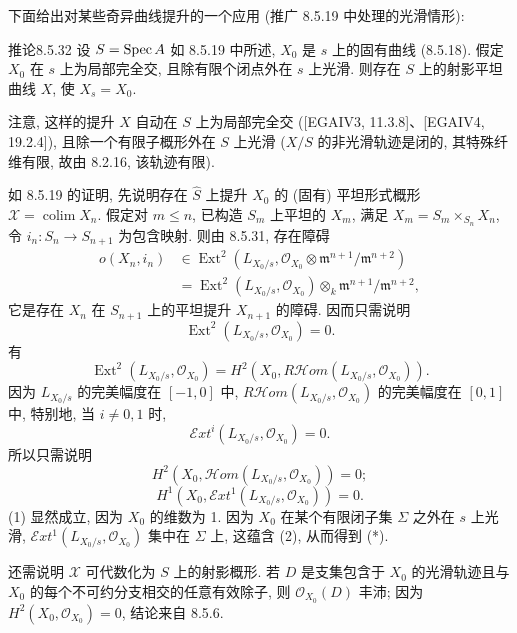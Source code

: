 下面给出对某些奇异曲线提升的一个应用 (推广 8.5.19 中处理的光滑情形):
\begin{origstatement}{推论}{8.5.32}\label{ch08:cor8532}
设 $S=\operatorname{Spec} A$ 如 8.5.19 中所述, $X_0$ 是 $s$ 上的固有曲线 (8.5.18). 假定 $X_0$ 在 $s$ 上为局部完全交, 且除有限个闭点外在 $s$ 上光滑. 则存在 $S$ 上的射影平坦曲线 $X$, 使 $X_s=X_0$.
\end{origstatement}
注意, 这样的提升 $X$ 自动在 $S$ 上为局部完全交 ([EGAIV3, 11.3.8]、[EGAIV4, 19.2.4]), 且除一个有限子概形外在 $S$ 上光滑 ($X/S$ 的非光滑轨迹是闭的, 其特殊纤维有限, 故由 8.2.16, 该轨迹有限).

如 8.5.19 的证明, 先说明存在 $\widehat S$ 上提升 $X_0$ 的 (固有) 平坦形式概形 $\mathcal X=\operatorname{colim}X_n$. 假定对 $m\leq n$, 已构造 $S_m$ 上平坦的 $X_m$, 满足 $X_m=S_m\times_{S_n}X_n$, 令 $i_n:S_n\to S_{n+1}$ 为包含映射. 则由 8.5.31, 存在障碍
\[\begin{aligned}
o(X_n,i_n)&\in\operatorname{Ext}^2(L_{X_0/s},\mathcal O_{X_0}\otimes\mathfrak m^{n+1}/\mathfrak m^{n+2})\\
&=\operatorname{Ext}^2(L_{X_0/s},\mathcal O_{X_0})\otimes_k\mathfrak m^{n+1}/\mathfrak m^{n+2},
\end{aligned}\]
它是存在 $X_n$ 在 $S_{n+1}$ 上的平坦提升 $X_{n+1}$ 的障碍. 因而只需说明
\begin{equation}\operatorname{Ext}^2(L_{X_0/s},\mathcal O_{X_0})=0.\tag{*}\label{ch08:eq8532star}\end{equation}
有
\[\operatorname{Ext}^2(L_{X_0/s},\mathcal O_{X_0})=H^2(X_0,R\mathcal Hom(L_{X_0/s},\mathcal O_{X_0})).\]
因为 $L_{X_0/s}$ 的完美幅度在 $[-1,0]$ 中, $R\mathcal Hom(L_{X_0/s},\mathcal O_{X_0})$ 的完美幅度在 $[0,1]$ 中, 特别地, 当 $i\ne0,1$ 时,
\[\mathcal Ext^i(L_{X_0/s},\mathcal O_{X_0})=0.\]
所以只需说明
\begin{equation}H^2(X_0,\mathcal Hom(L_{X_0/s},\mathcal O_{X_0}))=0;\tag{1}\label{ch08:eq85321}\end{equation}
\begin{equation}H^1(X_0,\mathcal Ext^1(L_{X_0/s},\mathcal O_{X_0}))=0.\tag{2}\label{ch08:eq85322}\end{equation}
(1) 显然成立, 因为 $X_0$ 的维数为 1. 因为 $X_0$ 在某个有限闭子集 $\Sigma$ 之外在 $s$ 上光滑, $\mathcal Ext^1(L_{X_0/s},\mathcal O_{X_0})$ 集中在 $\Sigma$ 上, 这蕴含 (2), 从而得到 (*).

还需说明 $\mathcal X$ 可代数化为 $S$ 上的射影概形. 若 $D$ 是支集包含于 $X_0$ 的光滑轨迹且与 $X_0$ 的每个不可约分支相交的任意有效除子, 则 $\mathcal O_{X_0}(D)$ 丰沛; 因为 $H^2(X_0,\mathcal O_{X_0})=0$, 结论来自 8.5.6.

